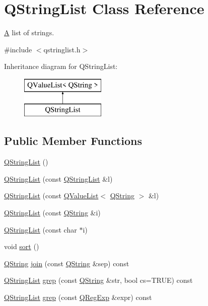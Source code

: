 \hypertarget{class_q_string_list}{}\section{Q\+String\+List Class Reference}
\label{class_q_string_list}


\mbox{\hyperlink{class_a}{A}} list of strings.  




{\ttfamily \#include $<$qstringlist.\+h$>$}

Inheritance diagram for Q\+String\+List\+:\begin{figure}[H]
\begin{center}
\leavevmode
\includegraphics[height=2.000000cm]{class_q_string_list}
\end{center}
\end{figure}
\subsection*{Public Member Functions}
\begin{DoxyCompactItemize}
\item 
\mbox{\hyperlink{class_q_string_list_a3e6ca70816297d8ad4b7baa749a0b8e2}{Q\+String\+List}} ()
\item 
\mbox{\hyperlink{class_q_string_list_a81b4d15aba319a62202e2b5c53212c5d}{Q\+String\+List}} (const \mbox{\hyperlink{class_q_string_list}{Q\+String\+List}} \&l)
\item 
\mbox{\hyperlink{class_q_string_list_ab94a73fead9d31d023d4fc0816542f33}{Q\+String\+List}} (const \mbox{\hyperlink{class_q_value_list}{Q\+Value\+List}}$<$ \mbox{\hyperlink{class_q_string}{Q\+String}} $>$ \&l)
\item 
\mbox{\hyperlink{class_q_string_list_ae2fcb3e62bfc329f6f4609cb387cb52d}{Q\+String\+List}} (const \mbox{\hyperlink{class_q_string}{Q\+String}} \&i)
\item 
\mbox{\hyperlink{class_q_string_list_acc4b2b8e5b8b04da731af0657491c963}{Q\+String\+List}} (const char $\ast$i)
\item 
void \mbox{\hyperlink{class_q_string_list_a1b3bf672d6dd980fb487e9392fdd9bd6}{sort}} ()
\item 
\mbox{\hyperlink{class_q_string}{Q\+String}} \mbox{\hyperlink{class_q_string_list_a4d14f4987725926a5c812991a27d0f91}{join}} (const \mbox{\hyperlink{class_q_string}{Q\+String}} \&sep) const
\item 
\mbox{\hyperlink{class_q_string_list}{Q\+String\+List}} \mbox{\hyperlink{class_q_string_list_ae22f5a9cd58ef6b7f99946f800625344}{grep}} (const \mbox{\hyperlink{class_q_string}{Q\+String}} \&str, bool cs=T\+R\+UE) const
\item 
\mbox{\hyperlink{class_q_string_list}{Q\+String\+List}} \mbox{\hyperlink{class_q_string_list_ae04b71725ca03fd3bace74af83df48fa}{grep}} (const \mbox{\hyperlink{class_q_reg_exp}{Q\+Reg\+Exp}} \&expr) const
\end{DoxyCompactItemize}
